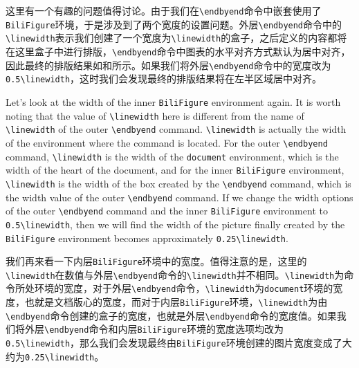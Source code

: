 \begin{ParaColumn}
    \switchcolumn

    这里有一个有趣的问题值得讨论。由于我们在\verb"\endbyend"命令中嵌套使用了\verb"BiliFigure"环境，于是涉及到了两个宽度的设置问题。外层\verb"\endbyend"命令中的\verb"\linewidth"表示我们创建了一个宽度为\verb"\linewidth"的盒子，之后定义的内容都将在这里盒子中进行排版，\verb"\endbyend"命令中图表的水平对齐方式默认为居中对齐，因此最终的排版结果如和所示。如果我们将外层\verb"\endbyend"命令中的宽度改为\verb"0.5\linewidth"，这时我们会发现最终的排版结果将在左半区域居中对齐。

    \switchcolumn*
        
    Let's look at the width of the inner \verb"BiliFigure" environment again.  It is worth noting that the value of \verb"\linewidth" here is different from the name of \verb"\linewidth" of the outer \verb"\endbyend" command.  \verb"\linewidth" is actually the width of the environment where the command is located. For the outer \verb"\endbyend" command, \verb"\linewidth" is the width of the \verb"document" environment, which is the width of the heart of the document, and for the inner \verb"BiliFigure" environment, \verb"\linewidth" is the width of the box created by the \verb"\endbyend" command, which is the width value of the outer \verb"\endbyend" command.  If we change the width options of the outer \verb"\endbyend" command and the inner \verb"BiliFigure" environment to \verb"0.5\linewidth", then we will find the width of the picture finally created by the \verb"BiliFigure" environment becomes approximately \verb"0.25\linewidth".

    \switchcolumn

    我们再来看一下内层\verb"BiliFigure"环境中的宽度。值得注意的是，这里的\verb"\linewidth"在数值与外层\verb"\endbyend"命令的\verb"\linewidth"并不相同。\verb"\linewidth"为命令所处环境的宽度，对于外层\verb"\endbyend"命令，\verb"\linewidth"为\verb"document"环境的宽度，也就是文档版心的宽度，而对于内层\verb"BiliFigure"环境，\verb"\linewidth"为由\verb"\endbyend"命令创建的盒子的宽度，也就是外层\verb"\endbyend"命令的宽度值。如果我们将外层\verb"\endbyend"命令和内层\verb"BiliFigure"环境的宽度选项均改为\verb"0.5\linewidth"，那么我们会发现最终由\verb"BiliFigure"环境创建的图片宽度变成了大约为\verb"0.25\linewidth"。



\end{ParaColumn}
